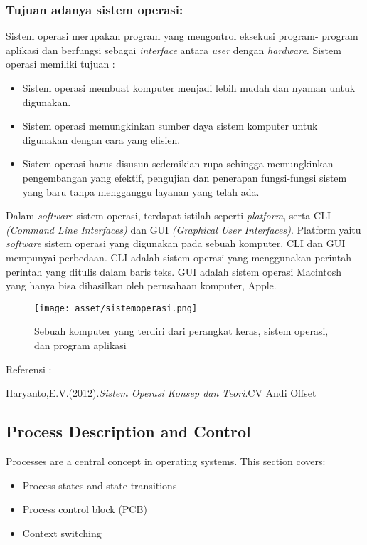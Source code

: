 \documentclass[12pt]{article}
\begin{document}
\subsubsection *{Tujuan adanya sistem operasi:}
Sistem operasi merupakan program yang mengontrol eksekusi program- program aplikasi dan berfungsi sebagai \textit{interface} antara \textit{user} dengan \textit{hardware}. Sistem operasi memiliki tujuan :
\begin{itemize}
    \item Sistem operasi membuat komputer menjadi lebih mudah dan nyaman untuk digunakan.
    \item Sistem operasi memungkinkan sumber daya sistem komputer untuk digunakan dengan cara yang efisien.
    \item Sistem operasi harus disusun sedemikian rupa sehingga memungkinkan pengembangan yang efektif, pengujian dan penerapan fungsi-fungsi sistem yang baru tanpa mengganggu layanan yang telah ada.
\end{itemize}
Dalam \textit{software} sistem operasi, terdapat istilah seperti \textit{platform}, serta CLI \textit{(Command Line Interfaces)} dan GUI \textit{(Graphical User Interfaces)}. Platform yaitu \textit{software} sistem operasi yang digunakan pada sebuah komputer. CLI dan GUI mempunyai perbedaan. CLI adalah sistem operasi yang menggunakan perintah-perintah yang ditulis dalam baris teks. GUI adalah sistem operasi Macintosh yang hanya bisa dihasilkan oleh perusahaan komputer, Apple.
\begin{figure}[h]
		\centering
		\texttt{[image: asset/sistemoperasi.png]}
		\caption{Sebuah komputer yang terdiri dari perangkat keras, sistem operasi, dan program aplikasi} 
		\label{fig:contoh_gambar}
	\end{figure}
    \item Referensi :
    \item Haryanto,E.V.(2012).\textit{Sistem Operasi Konsep dan Teori}.CV Andi Offset

\subsection{Process Description and Control}
Processes are a central concept in operating systems. This section covers:
\begin{itemize}
    \item Process states and state transitions
    \item Process control block (PCB)
    \item Context switching
\end{itemize}
\end{document}
